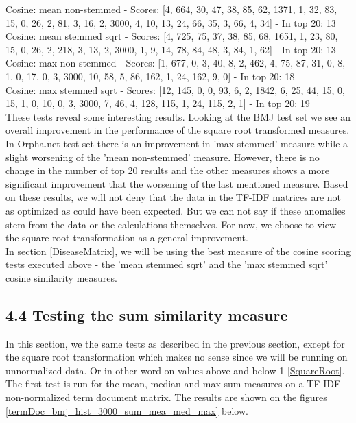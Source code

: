  
Cosine: mean non-stemmed - Scores: [4, 664, 30, 47, 38, 85, 62, 1371, 1, 32, 83, 15, 0, 26, 2, 81, 3, 16, 2, 3000, 4, 10, 13, 24, 66, 35, 3, 66, 4, 34] - In top 20: 13 \\
Cosine: mean stemmed sqrt - Scores: [4, 725, 75, 37, 38, 85, 68, 1651, 1, 23, 80, 15, 0, 26, 2, 218, 3, 13, 2, 3000, 1, 9, 14, 78, 84, 48, 3, 84, 1, 62] - In top 20: 13 \\
Cosine: max non-stemmed - Scores: [1, 677, 0, 3, 40, 8, 2, 462, 4, 75, 87, 31, 0, 8, 1, 0, 17, 0, 3, 3000, 10, 58, 5, 86, 162, 1, 24, 162, 9, 0] - In top 20: 18 \\
Cosine: max stemmed sqrt - Scores: [12, 145, 0, 0, 93, 6, 2, 1842, 6, 25, 44, 15, 0, 15, 1, 0, 10, 0, 3, 3000, 7, 46, 4, 128, 115, 1, 24, 115, 2, 1] - In top 20: 19 \\

These tests reveal some interesting results. Looking at the BMJ test set we see an overall improvement in the performance of the square root transformed measures. In Orpha.net test set there is an improvement in 'max stemmed' measure while a slight worsening of the 'mean non-stemmed' measure. However, there is no change in the number of top 20 results and the other measures shows a more significant improvement that the worsening of the last mentioned measure. Based on these results, we will not deny that the data in the TF-IDF matrices are not as optimized as could have been expected. But we can not say if these anomalies stem from the data or the calculations themselves. For now, we choose to view the square root transformation as a general improvement. \\

In section \ref{DiseaseMatrix}, we will be using the best measure of the cosine scoring tests executed above - the 'mean stemmed sqrt' and the 'max stemmed sqrt' cosine similarity measures. \\

\subsection{4.4 Testing the sum similarity measure\label{TestingSumSimilarity}}

In this section, we the same tests as described in the previous section, except for the square root transformation which makes no sense since we will be running on unnormalized data. Or in other word on values above and below 1 \ref{SquareRoot}. The first test is run for the mean, median and max sum measures on a TF-IDF non-normalized term document matrix. The results are shown on the figures \ref{termDoc_bmj_hist_3000_sum_mea_med_max} below. 

